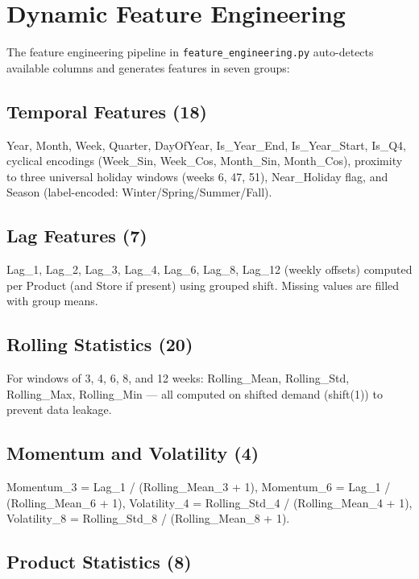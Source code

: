 \documentclass[conference]{IEEEtran}
\begin{document}
\section{Dynamic Feature Engineering}

The feature engineering pipeline in \texttt{feature\_engineering.py} auto-detects available columns and generates features in seven groups:

\subsection{Temporal Features (18)}

Year, Month, Week, Quarter, DayOfYear, Is\_Year\_End, Is\_Year\_Start, Is\_Q4, cyclical encodings (Week\_Sin, Week\_Cos, Month\_Sin, Month\_Cos), proximity to three universal holiday windows (weeks 6, 47, 51), Near\_Holiday flag, and Season (label-encoded: Winter/Spring/Summer/Fall).

\subsection{Lag Features (7)}

Lag\_1, Lag\_2, Lag\_3, Lag\_4, Lag\_6, Lag\_8, Lag\_12 (weekly offsets) computed per Product (and Store if present) using grouped shift. Missing values are filled with group means.

\subsection{Rolling Statistics (20)}

For windows of 3, 4, 6, 8, and 12 weeks: Rolling\_Mean, Rolling\_Std, Rolling\_Max, Rolling\_Min — all computed on shifted demand (shift(1)) to prevent data leakage.

\subsection{Momentum and Volatility (4)}

Momentum\_3 = Lag\_1 / (Rolling\_Mean\_3 + 1), Momentum\_6 = Lag\_1 / (Rolling\_Mean\_6 + 1), Volatility\_4 = Rolling\_Std\_4 / (Rolling\_Mean\_4 + 1), Volatility\_8 = Rolling\_Std\_8 / (Rolling\_Mean\_8 + 1).

\subsection{Product Statistics (8)}
\end{document}
